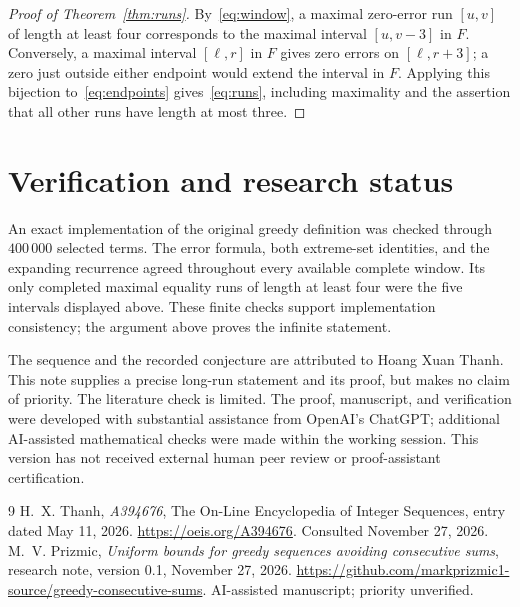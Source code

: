 \documentclass[11pt]{article}
\begin{document}
\begin{proof}[Proof of Theorem~\ref{thm:runs}]
By~\eqref{eq:window}, a maximal zero-error run $[u,v]$ of length at least
four corresponds to the maximal interval $[u,v-3]$ in $F$. Conversely, a
maximal interval $[\ell,r]$ in $F$ gives zero errors on $[\ell,r+3]$; a
zero just outside either endpoint would extend the interval in $F$.
Applying this bijection to~\eqref{eq:endpoints} gives~\eqref{eq:runs},
including maximality and the assertion that all other runs have length
at most three.
\end{proof}

\section{Verification and research status}

An exact implementation of the original greedy definition was checked
through $400\,000$ selected terms. The error formula, both extreme-set
identities, and the expanding recurrence agreed throughout every available
complete window. Its only completed maximal equality runs of length at least
four were the five intervals displayed above. These finite checks support
implementation consistency; the argument above proves the infinite statement.

The sequence and the recorded conjecture are attributed to Hoang Xuan
Thanh. This note supplies a precise long-run statement and its proof, but
makes no claim of priority. The literature check is limited. The proof,
manuscript, and verification were developed with substantial assistance
from OpenAI's ChatGPT; additional AI-assisted mathematical checks were made
within the working session. This version has not received external human
peer review or proof-assistant certification.

\begin{thebibliography}{9}
\small
{}
H.~X. Thanh, \emph{A394676}, The On-Line Encyclopedia of Integer Sequences,
entry dated May 11, 2026.
\url{https://oeis.org/A394676}. Consulted November 27, 2026.
M.~V. Prizmic, \emph{Uniform bounds for greedy sequences avoiding consecutive
sums}, research note, version 0.1, November 27, 2026.
\url{https://github.com/markprizmic1-source/greedy-consecutive-sums}.
AI-assisted manuscript; priority unverified.
\end{thebibliography}
\end{document}
